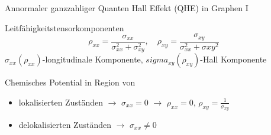 \documentclass[../defence.tex]{subfiles}
\begin{document}
  \begin{frame}{Annormaler ganzzahliger Quanten Hall Effekt (QHE) in Graphen I}
    \pause
    \begin{block}{Leitfähigkeitstensorkomponenten}
      \begin{equation*}
        \rho_{xx}=\frac{\sigma_{xx}}{\sigma_{xx}^2+\sigma_{xy}^2},\quad \rho_{xy}=\frac{\sigma_{xy}}{\sigma_{xx}^2+\sigma{xy}^2}
      \end{equation*}
      $\sigma_{xx}(\rho_{xx})$-longitudinale Komponente, $sigma_{xy}(\rho_{xy})$-Hall Komponente
    \end{block}
    \pause
    \begin{block}{Chemisches Potential in Region von}
      \pause
      \begin{itemize}
        \item lokalisierten Zuständen $\rightarrow$ $\sigma_{xx}=0$ $\rightarrow$ $\rho_{xx}=0$, $\rho_{xy}=\frac{1}{\sigma_{xy}}$
        \pause
        \item delokalisierten Zuständen $\rightarrow$ $\sigma_{xx}\ne 0$
      \end{itemize}
    \end{block}
  \end{frame}
\end{document}
